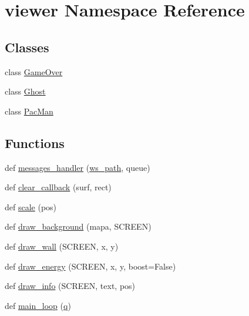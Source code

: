 \hypertarget{namespaceviewer}{}\section{viewer Namespace Reference}
\label{namespaceviewer}
\subsection*{Classes}
\begin{DoxyCompactItemize}
\item 
class \hyperlink{classviewer_1_1_game_over}{Game\+Over}
\item 
class \hyperlink{classviewer_1_1_ghost}{Ghost}
\item 
class \hyperlink{classviewer_1_1_pac_man}{Pac\+Man}
\end{DoxyCompactItemize}
\subsection*{Functions}
\begin{DoxyCompactItemize}
\item 
def \hyperlink{namespaceviewer_a0826d04cc7d687880b5319be8eb7cd43}{messages\+\_\+handler} (\hyperlink{namespaceviewer_aa3b7314e33c7838d36b05e751690ea1b}{ws\+\_\+path}, queue)
\item 
def \hyperlink{namespaceviewer_abc882e9f90b892fa6984e88c1a387920}{clear\+\_\+callback} (surf, rect)
\item 
def \hyperlink{namespaceviewer_aa2b64260b485ecd3de1ef871b30cb966}{scale} (pos)
\item 
def \hyperlink{namespaceviewer_a1907ec5a9737fd37e3d6401cedfe3c86}{draw\+\_\+background} (mapa, S\+C\+R\+E\+EN)
\item 
def \hyperlink{namespaceviewer_a9907b06131a30cefdda3202aa498e6b6}{draw\+\_\+wall} (S\+C\+R\+E\+EN, x, y)
\item 
def \hyperlink{namespaceviewer_a2d2685c19dd8912cb8999147b8774a39}{draw\+\_\+energy} (S\+C\+R\+E\+EN, x, y, boost=False)
\item 
def \hyperlink{namespaceviewer_ad78eceb6648e8eadcdcb58cf7d161dfb}{draw\+\_\+info} (S\+C\+R\+E\+EN, text, pos)
\item 
def \hyperlink{namespaceviewer_a4e02ea07dd7149a5b5afcffb300c14aa}{main\+\_\+loop} (\hyperlink{namespaceviewer_a1f452bb9e64e242ae0cf6089e85cf1ca}{q})
\end{DoxyCompactItemize}
